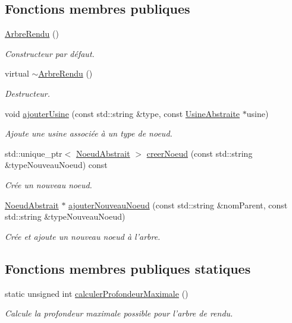 \subsection*{Fonctions membres publiques}
\begin{DoxyCompactItemize}
\item 
\hyperlink{group__inf2990_gaef1e98a66c4f1d3b468c786edee45ae6}{Arbre\-Rendu} ()
\begin{DoxyCompactList}\small\item\em Constructeur par défaut. \end{DoxyCompactList}\item 
virtual \hyperlink{group__inf2990_gadb462923759da0ff632dad097b7bfdab}{$\sim$\-Arbre\-Rendu} ()
\begin{DoxyCompactList}\small\item\em Destructeur. \end{DoxyCompactList}\item 
void \hyperlink{group__inf2990_ga296a744837fb7b779fadf2e8c62e6577}{ajouter\-Usine} (const std\-::string \&type, const \hyperlink{class_usine_abstraite}{Usine\-Abstraite} $\ast$usine)
\begin{DoxyCompactList}\small\item\em Ajoute une usine associée à un type de noeud. \end{DoxyCompactList}\item 
std\-::unique\-\_\-ptr$<$ \hyperlink{class_noeud_abstrait}{Noeud\-Abstrait} $>$ \hyperlink{group__inf2990_gaead1f3ae9de5de53e31ad9e886ba259c}{creer\-Noeud} (const std\-::string \&type\-Nouveau\-Noeud) const 
\begin{DoxyCompactList}\small\item\em Crée un nouveau noeud. \end{DoxyCompactList}\item 
\hyperlink{class_noeud_abstrait}{Noeud\-Abstrait} $\ast$ \hyperlink{group__inf2990_gac10e5f0623af502d67f72aef764206a3}{ajouter\-Nouveau\-Noeud} (const std\-::string \&nom\-Parent, const std\-::string \&type\-Nouveau\-Noeud)
\begin{DoxyCompactList}\small\item\em Crée et ajoute un nouveau noeud à l'arbre. \end{DoxyCompactList}\end{DoxyCompactItemize}
\subsection*{Fonctions membres publiques statiques}
\begin{DoxyCompactItemize}
\item 
static unsigned int \hyperlink{group__inf2990_gacf0e53d52040b07cd6550fda79867bd5}{calculer\-Profondeur\-Maximale} ()
\begin{DoxyCompactList}\small\item\em Calcule la profondeur maximale possible pour l'arbre de rendu. \end{DoxyCompactList}\end{DoxyCompactItemize}
